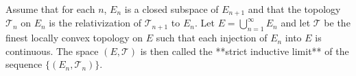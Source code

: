 Assume that for each $n$, $E_n$ is a closed subspace of $E_{n+1}$ and that the topology $\mathcal{T}_n$ on $E_n$ is the relativization of $\mathcal{T}_{n+1}$ to $E_n$. Let $E = \bigcup_{n=1}^{\infty} E_n$ and let $\mathcal{T}$ be the finest locally convex topology on $E$ such that each injection of $E_n$ into $E$ is continuous. The space $(E, \mathcal{T})$ is then called the **strict inductive limit** of the sequence $\{(E_n, \mathcal{T}_n)\}$.
